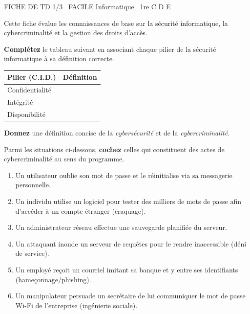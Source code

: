 \documentclass[11pt]{article}
\begin{document}
\begin{tcolorbox}[enhanced,colback=popink,colframe=popink,arc=10pt,boxrule=0pt,left=12pt,right=12pt,top=9pt,bottom=9pt]
{\color{white}\popxbold\small FICHE DE TD 1/3 \textbullet\ FACILE \hfill Informatique \textbullet\ 1re C D E\par}
\end{tcolorbox}
\vspace{4pt}
Cette fiche évalue les connaissances de base sur la sécurité informatique, la cybercriminalité et la gestion des droits d'accès.

\begin{exercice}
\textbf{Complétez} le tableau suivant en associant chaque pilier de la sécurité informatique à sa définition correcte.

\begin{tabular}{|p{3.5cm}|p{12cm}|}
\hline
\textbf{Pilier (C.I.D.)} & \textbf{Définition} \\ \hline
Confidentialité & \dotfill \\ \hline
Intégrité & \dotfill \\ \hline
Disponibilité & \dotfill \\ \hline
\end{tabular}

\vspace{0.3cm}
\textbf{Donnez} une définition concise de la \textit{cybersécurité} et de la \textit{cybercriminalité}.
\end{exercice}

\begin{exercice}
Parmi les situations ci-dessous, \textbf{cochez} celles qui constituent des actes de cybercriminalité au sens du programme.

\begin{enumerate}
    \item Un utilisateur oublie son mot de passe et le réinitialise via sa messagerie personnelle.
    \item Un individu utilise un logiciel pour tester des milliers de mots de passe afin d'accéder à un compte étranger (craquage).
    \item Un administrateur réseau effectue une sauvegarde planifiée du serveur.
    \item Un attaquant inonde un serveur de requêtes pour le rendre inaccessible (déni de service).
    \item Un employé reçoit un courriel imitant sa banque et y entre ses identifiants (hameçonnage/phishing).
    \item Un manipulateur persuade un secrétaire de lui communiquer le mot de passe Wi-Fi de l'entreprise (ingénierie sociale).
\end{enumerate}
\end{exercice}
\end{document}
